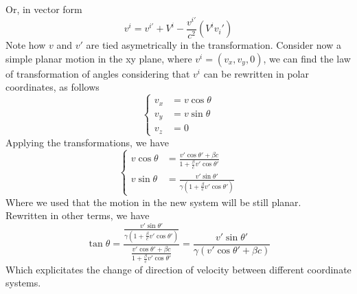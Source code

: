 \documentclass[../admech.tex]{subfiles}
\begin{document}
Or, in vector form
\begin{equation}
	v^i=v^{i'}+V^i-\frac{v^{i'}}{c^2}(V^iv_i')
	\label{eq:vectorform}
\end{equation}
Note how $v$ and $v'$ are tied asymetrically in the transformation. Consider now a simple planar motion in the xy plane, where $v^i=(v_x,v_y,0)$, we can find the law of transformation of angles considering that $v^i$ can be rewritten in polar coordinates, as follows
\begin{equation*}
	\left\{\begin{aligned}
		v_x&=v\cos\theta\\
		v_y&=v\sin\theta\\
		v_z&=0
	\end{aligned}\right.
\end{equation*}
Applying the transformations, we have
\begin{equation}
	\left\{\begin{aligned}
			v\cos\theta&=\frac{v'\cos\theta'+\beta c}{1+\frac{\beta}{c}v'\cos\theta'}\\
			v\sin\theta&=\frac{v'\sin\theta'}{\gamma\left( 1+\frac{\beta}{c}v'\cos\theta' \right)}
	\end{aligned}\right.
	\label{eq:angletrvel}
\end{equation}
Where we used that the motion in the new system will be still planar.\\
Rewritten in other terms, we have
\begin{equation}
	\tan\theta=\frac{\frac{v'\sin\theta'}{\gamma\left( 1+\frac{\beta}{c}v'\cos\theta' \right)}}{\frac{v'\cos\theta'+\beta c}{1+\frac{\beta}{c}v'\cos\theta'}}=\frac{v'\sin\theta'}{\gamma\left( v'\cos\theta'+\beta c \right)}
	\label{eq:tantr}
\end{equation}
Which explicitates the change of direction of velocity between different coordinate systems.
\end{document}
